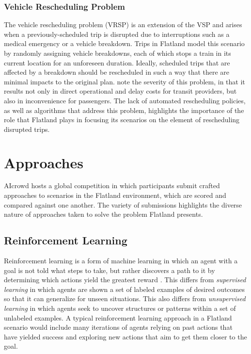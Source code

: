 \documentclass[11pt]{article}
\begin{document}
\subsubsection{Vehicle Rescheduling Problem}
The vehicle rescheduling problem (VRSP) \citep{limibo07a} is an extension of the VSP and arises when a previously-scheduled trip is disrupted due to interruptions such as a medical emergency or a vehicle breakdown.  Trips in Flatland model this scenario by randomly assigning vehicle breakdowns, each of which stops a train in its current location for an unforeseen duration.  Ideally, scheduled trips that are affected by a breakdown should be rescheduled in such a way that there are minimal impacts to the original plan.  \citep{limibo07a} note the severity of this problem, in that it results not only in direct operational and delay costs for transit providers, but also in inconvenience for passengers.  The lack of automated rescheduling policies, as well as algorithms that address this problem, highlights the importance of the role that Flatland plays in focusing its scenarios on the element of rescheduling disrupted trips.


\section{Approaches}
AIcrowd \citep{baeiegljmomonyspwaaggo21a} hosts a global competition in which participants submit crafted approaches to scenarios in the Flatland environment, which are scored and compared against one another.  The variety of submissions highlights the diverse nature of approaches taken to solve the problem Flatland presents.

\subsection{Reinforcement Learning}
Reinforcement learning is a form of machine learning in which an agent with a goal is not told what steps to take, but rather discovers a path to it by determining which actions yield the greatest reward \citep{sutton18a}.  This differs from \textit{supervised learning} in which agents are shown a set of labeled examples of desired outcomes so that it can generalize for unseen situations.  This also differs from \textit{unsupervised learning} in which agents seek to uncover structures or patterns within a set of unlabeled examples.  A typical reinforcement learning approach in a Flatland scenario would include many iterations of agents relying on past actions that have yielded success and exploring new actions that aim to get them closer to the goal.
\end{document}
